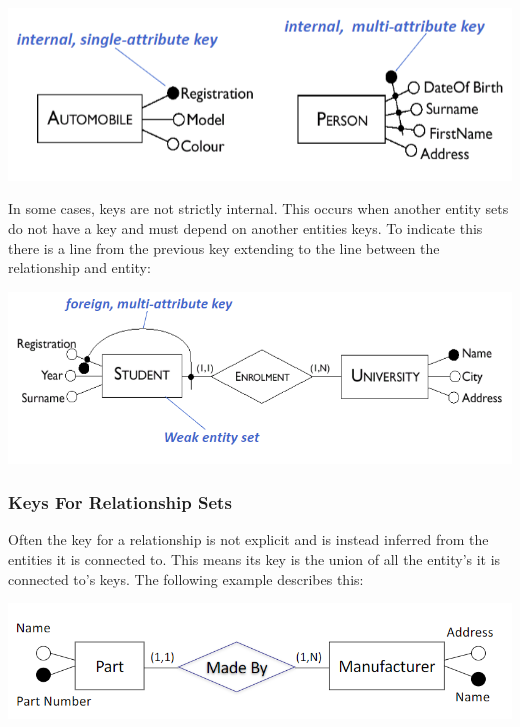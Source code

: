 \documentclass{report}
\begin{document}
\begin{center}
    \includegraphics[scale=.85]{2022-12-13-20-57-04.png}
\end{center}

In some cases, keys are not strictly internal. This occurs when another entity sets do not have a key and must depend on another entities keys. To indicate this there is a line from the previous key extending to the line between the relationship and entity:

\begin{center}
    \includegraphics[scale=.8]{2022-12-13-21-00-54.png}
\end{center}


\subsubsection{Keys For Relationship Sets}
Often the key for a relationship is not explicit and is instead inferred from the entities it is connected to. This means its key is the union of all the entity's it is connected to's keys. The following example describes this:

\begin{center}
    \includegraphics[scale=.7]{2022-12-13-21-18-41.png}
\end{center}
\end{document}
